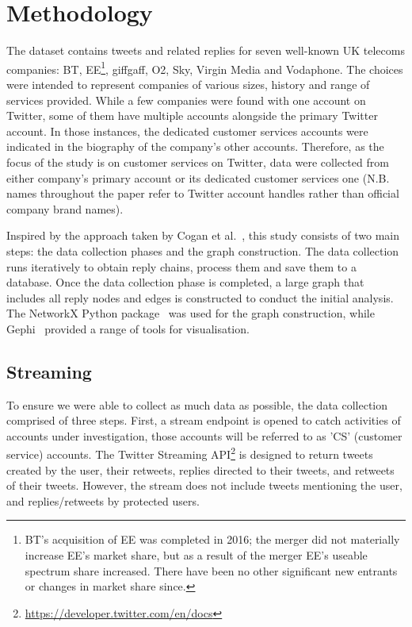 \documentclass[sigconf]{acmart}
\begin{document}
\section{Methodology}\label{method}

The dataset contains tweets and related replies for seven well-known
UK telecoms companies: BT, EE\footnote{BT's acquisition of EE was
completed in 2016; the merger did not materially increase EE's market
share, but as a result of the merger EE's useable spectrum share
increased. There have been no other significant new entrants or
changes in market share since.}, giffgaff, O2, Sky, Virgin Media and
Vodaphone. The choices were intended to represent companies of various
sizes, history and range of services provided. While a few companies
were found with one account on Twitter, some of them have multiple
accounts alongside the primary Twitter account. In those instances,
the dedicated customer services accounts were indicated in the
biography of the company's other accounts. Therefore, as the focus of
the study is on customer services on Twitter, data were collected from
either company's primary account or its dedicated customer services
one (N.B. names throughout the paper refer to Twitter account handles
rather than official company brand names).

Inspired by the approach taken by Cogan et al.~\cite{Cogan2012}, this
study consists of two main steps: the data collection phases and the
graph construction. The data collection runs iteratively to obtain
reply chains, process them and save them to a database. Once the data
collection phase is completed, a large graph that includes all reply
nodes and edges is constructed to conduct the initial analysis. The
NetworkX Python package~\cite{Hagberg2008} was used for the graph
construction, while Gephi~\cite{Bastian2009} provided a range of tools
for visualisation.


\subsection{Streaming}

To ensure we were able to collect as much data as possible, the data
collection comprised of three steps. First, a stream endpoint is
opened to catch activities of accounts under investigation, those
accounts will be referred to as 'CS' (customer service)
accounts. The Twitter Streaming
API\footnote{\url{https://developer.twitter.com/en/docs}} is designed
to return tweets created by the user, their retweets, replies directed
to their tweets, and retweets of their tweets. However, the stream
does not include tweets mentioning the user, and replies/retweets by
protected users.
\end{document}
